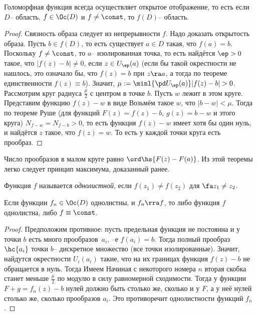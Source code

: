 \documentclass[a4paper]{article}
\begin{document}
\begin{theorem}
Голоморфная функция всегда осуществляет открытое отображение, то есть если
$D$-- область, $f\in\Oc(D)$ и $f\neq\const$, то $f(D)$-- область.
\end{theorem}
\begin{proof}
Связность образа следует из непрерывности $f$. Надо доказать открытость образа. Пусть $b\in f(D)$,
то есть существует $a \in D$ такая, что $f(a)=b$. Поскольку $f\neq \const$, то $a$-- изолированная точка,
то есть найдётся $\ep > 0$ такое, что $|f(z) - b| \neq 0$, если $z \in U_\ep(a)$ (если бы такой окрестности
не нашлось, это означало бы, что $f(z) = b$ при $z\ra a$, а тогда по теореме единственности $f(z) \equiv b$).
Значит, $\mu := \minl{\pd U_\ep(a)} |f(z)-b| > 0$.
Рассмотрим круг радиуса $\frac\mu2$ с центром в точке $b$. Пусть $w$ лежит в этом круге.
Представим функцию $f(z)-w$ в виде
Возьмём такое $w$, что $|b-w|<\mu$. Тогда по теореме Руше (для функций $F(z) =f(z)-b$, $g(z)=b-w$ и этого круга) $N_{f-w}=N_{f-b}>0$, то есть функция $f(z)-w$ имеет
хотя бы один нуль, и найдётся $z$ такое, что $f(z)=w$. То есть у каждой точки круга есть прообраз.
\end{proof}
\begin{note}
Число прообразов в малом круге равно $\ord\hs{F(z)-F(a)}$. Из этой теоремы легко
следует принцип максимума, доказанный ранее.
\end{note}

\begin{df}
Функция $f$ называется \emph{однолистной}, если $f(z_1) \neq f(z_2)$ для $\fa z_1 \neq z_2$.
\end{df}

\begin{theorem}[Гурвица]
Если функции $f_n\in\Oc(D)$ однолистны, и $f_n \rra f$, то либо функция $f$ однолистна, либо $f \equiv \const$.
\end{theorem}
\begin{proof}
Предположим противное: пусть предельная функция не постоянна и у точки $b$ есть много прообразов~$a_i$,
--е $f(a_i)=b$. Тогда полный прообраз $\hc{a_i}$ точки $b$-- дискретное множество (все точки изолированные).
Значит, найдутся окрестности $U_i(a_i)$ такие, что на их границах функция $f(z)-b$ не обращается в нуль.
Тогда
Имеем
Начиная с некоторого номера $n$ вторая скобка станет меньше $\frac\mu2$ по модулю в силу равномерной сходимости.
Тогда у функции $F +g = f_n(z)-b$ нулей должно быть столько же, сколько и у $F$, а у неё нулей столько же, сколько
прообразов $a_i$. Это противоречит однолистности функций $f_n$.
\end{proof}
\end{document}
